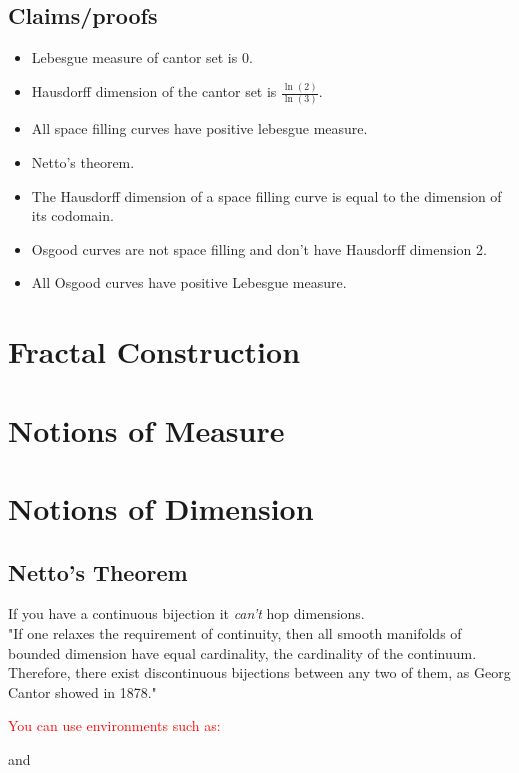 \documentclass[11pt]{ekblite}
\newcommand\aaron[1]{\textcolor{red}{#1}}
\begin{document}
	\subsection{Claims/proofs}
	\begin{itemize}
		\item Lebesgue measure of cantor set is 0.
		\item Hausdorff dimension of the cantor set is $\frac{\ln (2)}{\ln (3)}$.
		\item All space filling curves have positive lebesgue measure.
		\item Netto's theorem.
		\item The Hausdorff dimension of a space filling curve is equal to the dimension of its codomain.
		\item Osgood curves are not space filling and don't have Hausdorff dimension 2.
		\item All Osgood curves have positive Lebesgue measure.
	\end{itemize}
	\section{Fractal Construction}
    \section{Notions of Measure}
    \section{Notions of Dimension}
	\subsection{Netto's Theorem}
	If you have a continuous bijection it \textit{can't} hop dimensions.
	\\[0.2in]
    "If one relaxes the requirement of continuity, then all smooth manifolds of bounded dimension have equal cardinality, the cardinality of the continuum. Therefore, there exist discontinuous bijections between any two of them, as Georg Cantor showed in 1878."

\aaron{You can use environments such as:}
    \begin{theorem}
        
    \end{theorem}
    and 
    \begin{definition}
        
    \end{definition}



\end{document}
